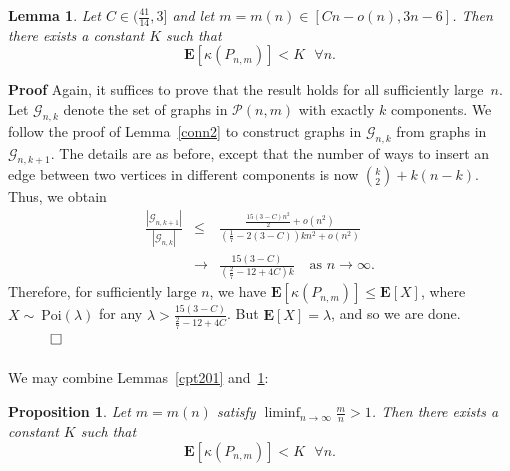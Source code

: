 \documentclass{article}
\newtheorem{Lemma}[Theorem]{Lemma}
\newtheorem{Proposition}[Theorem]{Proposition}
\newtheorem{Proof of Theorem}{Proof of Theorem}
\begin{document}
\begin{Lemma} \label{cpt202}
Let $C \in (\frac{41}{14},3]$ and let $m=m(n) \in [Cn-o(n), 3n-6]$.
Then there exists a constant $K$ such that
\begin{displaymath}
\mathbf{E}[\kappa (P_{n,m})] < K \textrm{ } \forall n.
\end{displaymath}
\end{Lemma}
\textbf{Proof}
Again,
it suffices to prove that the result holds for all sufficiently large~$n$.
Let $\mathcal{G}_{n,k}$ denote the set of graphs in $\mathcal{P}(n,m)$ with exactly $k$ components.
We follow the proof of Lemma~\ref{conn2} to construct graphs in $\mathcal{G}_{n,k}$ from graphs in~$\mathcal{G}_{n,k+1}$.
The details are as before, 
except that the number of ways to insert an edge between two vertices in different components is now
$\left( ^{k}_{2} \right)+ k(n-k)$.
Thus, we obtain 
\begin{eqnarray*}
\frac{|\mathcal{G}_{n,k+1}|}{|\mathcal{G}_{n,k}|} 
& \leq &  \frac{\frac{15(3-C)n^{2}}{2} + o(n^{2})}
{\left( \frac{1}{7}-2(3-C) \right)k n^{2} + o(n^{2})} \\
& \to & \frac{15(3-C)}{\left( \frac{2}{7} - 12 + 4C \right)k} \phantom{w} \textrm{ as } n \to \infty.
\end{eqnarray*}
Therefore, for sufficiently large $n$, we have
$\mathbf{E}[\kappa (P_{n,m})] \leq \mathbf{E}[X]$,
where $X \!\sim~\!\textrm{Poi} (\lambda)$ for any $\lambda > \frac{15(3-C)}{\frac{2}{7} - 12 + 4C}$.
But $\mathbf{E}[X] = \lambda$, and so we are done.
$\phantom{qwerty}
\setlength{\unitlength}{.25cm}
\begin{picture}(1,1)
\put(0,0){\line(1,0){1}}
\put(0,0){\line(0,1){1}}
\put(1,1){\line(-1,0){1}}
\put(1,1){\line(0,-1){1}}
\end{picture}$
\\
\\














We may combine Lemmas~\ref{cpt201} and~\ref{cpt202}:

\begin{Proposition} \label{cpt2031}
Let $m=m(n)$ satisfy $\liminf_{n \to \infty} \frac{m}{n} > 1$.
Then there exists a constant $K$ such that
\begin{displaymath}
\mathbf{E}[\kappa (P_{n,m})] < K \textrm{ } \forall n.
\end{displaymath} 
\end{Proposition} 
\end{document}
